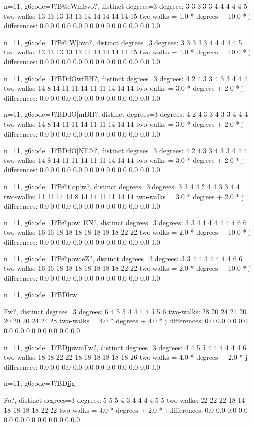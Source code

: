 {{{{{{{{{{{{{{n=11, g6code=J?B@cWmSvo?, distinct degrees=3
degrees: 3 3 3 3 3 4 4 4 4 4 5 
two-walks: 13 13 13 13 13 14 14 14 14 14 15 
two-walks = 1.0 * degrees + 10.0 * j
differences: 0.0 0.0 0.0 0.0 0.0 0.0 0.0 0.0 0.0 0.0 0.0 

n=11, g6code=J?B@`W]ovo?, distinct degrees=3
degrees: 3 3 3 3 3 4 4 4 4 4 5 
two-walks: 13 13 13 13 13 14 14 14 14 14 15 
two-walks = 1.0 * degrees + 10.0 * j
differences: 0.0 0.0 0.0 0.0 0.0 0.0 0.0 0.0 0.0 0.0 0.0 

n=11, g6code=J?BDdOwfBH?, distinct degrees=3
degrees: 4 2 4 3 3 4 3 3 4 4 4 
two-walks: 14 8 14 11 11 14 11 11 14 14 14 
two-walks = 3.0 * degrees + 2.0 * j
differences: 0.0 0.0 0.0 0.0 0.0 0.0 0.0 0.0 0.0 0.0 0.0 

n=11, g6code=J?BDdO[mBH?, distinct degrees=3
degrees: 4 2 4 3 3 4 3 3 4 4 4 
two-walks: 14 8 14 11 11 14 11 11 14 14 14 
two-walks = 3.0 * degrees + 2.0 * j
differences: 0.0 0.0 0.0 0.0 0.0 0.0 0.0 0.0 0.0 0.0 0.0 

n=11, g6code=J?BDdO[NF@?, distinct degrees=3
degrees: 4 2 4 3 3 4 3 3 4 4 4 
two-walks: 14 8 14 11 11 14 11 11 14 14 14 
two-walks = 3.0 * degrees + 2.0 * j
differences: 0.0 0.0 0.0 0.0 0.0 0.0 0.0 0.0 0.0 0.0 0.0 

n=11, g6code=J?B@t`op`w?, distinct degrees=3
degrees: 3 3 4 4 2 4 4 3 3 4 4 
two-walks: 11 11 14 14 8 14 14 11 11 14 14 
two-walks = 3.0 * degrees + 2.0 * j
differences: 0.0 0.0 0.0 0.0 0.0 0.0 0.0 0.0 0.0 0.0 0.0 

n=11, g6code=J?B@pow~EN?, distinct degrees=3
degrees: 3 3 4 4 4 4 4 4 4 6 6 
two-walks: 16 16 18 18 18 18 18 18 18 22 22 
two-walks = 2.0 * degrees + 10.0 * j
differences: 0.0 0.0 0.0 0.0 0.0 0.0 0.0 0.0 0.0 0.0 0.0 

n=11, g6code=J?B@pow|eZ?, distinct degrees=3
degrees: 3 3 4 4 4 4 4 4 4 6 6 
two-walks: 16 16 18 18 18 18 18 18 18 22 22 
two-walks = 2.0 * degrees + 10.0 * j
differences: 0.0 0.0 0.0 0.0 0.0 0.0 0.0 0.0 0.0 0.0 0.0 

n=11, g6code=J?BDlrw}Fw?, distinct degrees=3
degrees: 6 4 5 5 4 4 4 4 5 5 6 
two-walks: 28 20 24 24 20 20 20 20 24 24 28 
two-walks = 4.0 * degrees + 4.0 * j
differences: 0.0 0.0 0.0 0.0 0.0 0.0 0.0 0.0 0.0 0.0 0.0 

n=11, g6code=J?BDjpwmFw?, distinct degrees=3
degrees: 4 4 5 5 4 4 4 4 4 4 6 
two-walks: 18 18 22 22 18 18 18 18 18 18 26 
two-walks = 4.0 * degrees + 2.0 * j
differences: 0.0 0.0 0.0 0.0 0.0 0.0 0.0 0.0 0.0 0.0 0.0 

n=11, g6code=J?BDjjg}Fo?, distinct degrees=3
degrees: 5 5 5 4 3 4 4 4 4 5 5 
two-walks: 22 22 22 18 14 18 18 18 18 22 22 
two-walks = 4.0 * degrees + 2.0 * j
differences: 0.0 0.0 0.0 0.0 0.0 0.0 0.0 0.0 0.0 0.0 0.0 

}}}}}}}}}}}}
